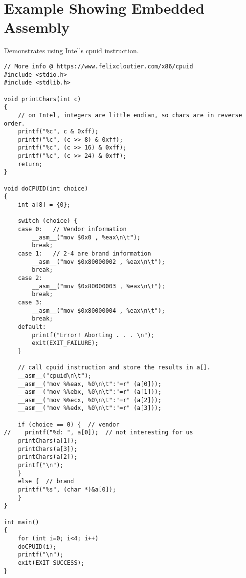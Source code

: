 \documentclass[12pt,letterpaper]{article}
\begin{document}
    \section{Example Showing Embedded Assembly }
    
    Demonstrates using Intel's cpuid instruction.

    \begin{verbatim}
// More info @ https://www.felixcloutier.com/x86/cpuid
#include <stdio.h>
#include <stdlib.h>

void printChars(int c)
{
    // on Intel, integers are little endian, so chars are in reverse order.
    printf("%c", c & 0xff);
    printf("%c", (c >> 8) & 0xff);
    printf("%c", (c >> 16) & 0xff);
    printf("%c", (c >> 24) & 0xff);
    return;
}

void doCPUID(int choice)
{
    int a[8] = {0};

    switch (choice) {
    case 0:   // Vendor information
        __asm__("mov $0x0 , %eax\n\t");
        break;
    case 1:   // 2-4 are brand information
        __asm__("mov $0x80000002 , %eax\n\t");
        break;
    case 2:
        __asm__("mov $0x80000003 , %eax\n\t");
        break;
    case 3:
        __asm__("mov $0x80000004 , %eax\n\t");
        break;
    default:
        printf("Error! Aborting . . . \n");
        exit(EXIT_FAILURE);
    }

    // call cpuid instruction and store the results in a[].
    __asm__("cpuid\n\t");
    __asm__("mov %%eax, %0\n\t":"=r" (a[0]));
    __asm__("mov %%ebx, %0\n\t":"=r" (a[1]));
    __asm__("mov %%ecx, %0\n\t":"=r" (a[2]));
    __asm__("mov %%edx, %0\n\t":"=r" (a[3]));

    if (choice == 0) {  // vendor
//    printf("%d: ", a[0]);  // not interesting for us
    printChars(a[1]);
    printChars(a[3]);
    printChars(a[2]);
    printf("\n");
    }
    else {  // brand
    printf("%s", (char *)&a[0]);
    }
}

int main()
{
    for (int i=0; i<4; i++)
    doCPUID(i);
    printf("\n");
    exit(EXIT_SUCCESS);
}
    \end{verbatim}
\end{document}
